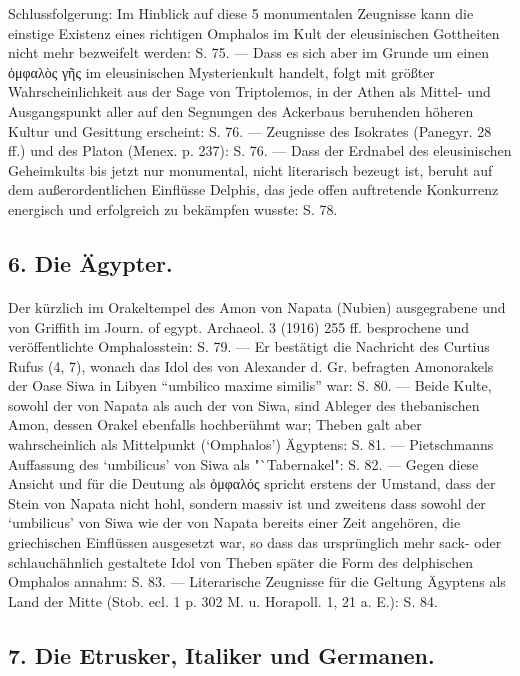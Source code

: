\documentclass[a4paper, 11pt, oneside]{article}
\begin{document}
Schlussfolgerung: Im Hinblick auf diese 5 monumentalen Zeugnisse kann die einstige Existenz eines richtigen Omphalos im Kult der eleusinischen Gottheiten nicht mehr bezweifelt werden: S. 75. --- Dass es sich aber im Grunde um einen ὀμφαλὸς γῆς im eleusinischen Mysterienkult handelt, folgt mit größter Wahrscheinlichkeit aus der Sage von Triptolemos, in der Athen als Mittel- und Ausgangspunkt aller auf den Segnungen des Ackerbaus beruhenden höheren Kultur und Gesittung erscheint: S. 76. --- Zeugnisse des Isokrates (Panegyr. 28 ff.) und des Platon (Menex. p. 237): S. 76. --- Dass der Erdnabel des eleusinischen Geheimkults bis jetzt nur monumental, nicht literarisch bezeugt ist, beruht auf dem außerordentlichen Einflüsse Delphis, das jede offen auftretende Konkurrenz energisch und erfolgreich zu bekämpfen wusste: S. 78.

\subsection*{6. Die Ägypter.}
\paragraph{}
Der kürzlich im Orakeltempel des Amon von Napata (Nubien) ausgegrabene und von Griffith im Journ. of egypt. Archaeol. 3 (1916) 255 ff. besprochene und veröffentlichte Omphalosstein: S. 79. --- Er bestätigt die Nachricht des Curtius Rufus (4, 7), wonach das Idol des von Alexander d. Gr. befragten Amonorakels der Oase Siwa in Libyen "`umbilico maxime similis"' war: S. 80. --- Beide Kulte, sowohl der von Napata als auch der von Siwa, sind Ableger des thebanischen Amon, dessen Orakel ebenfalls hochberühmt war; Theben galt aber wahrscheinlich als Mittelpunkt (`Omphalos') Ägyptens: S. 81. --- Pietschmanns Auffassung des `umbilicus' von Siwa als "`Tabernakel": S. 82. --- Gegen diese Ansicht und für die Deutung als ὀμφαλός spricht erstens der Umstand, dass der Stein von Napata nicht hohl, sondern massiv ist und zweitens dass sowohl der `umbilicus' von Siwa wie der von Napata bereits einer Zeit angehören, die griechischen Einflüssen ausgesetzt war, so dass das ursprünglich mehr sack- oder schlauchähnlich gestaltete Idol von Theben später die Form des delphischen Omphalos annahm: S. 83. --- Literarische Zeugnisse für die Geltung Ägyptens als Land der Mitte (Stob. ecl. 1 p. 302 M. u. Horapoll. 1, 21 a. E.): S. 84.

\subsection*{7. Die Etrusker, Italiker und Germanen.}
\end{document}
